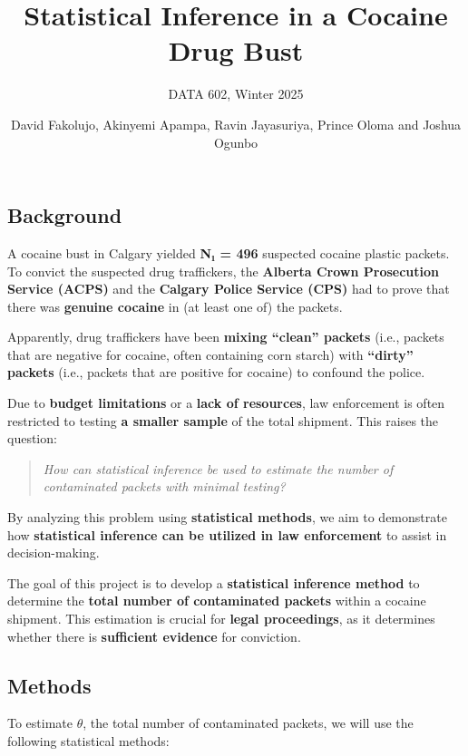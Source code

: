 \documentclass[
  14pt,
]{article}
\title{\textbf{Statistical Inference in a Cocaine Drug Bust}}
\subtitle{DATA 602, Winter 2025}
\author{David Fakolujo, Akinyemi Apampa, Ravin Jayasuriya, Prince Oloma
and Joshua Ogunbo}
\date{}
\begin{document}
\maketitle

\subsection{\texorpdfstring{\textbf{Background}}{Background}}\label{background}

A cocaine bust in Calgary yielded \textbf{N₁ = 496} suspected cocaine
plastic packets. To convict the suspected drug traffickers, the
\textbf{Alberta Crown Prosecution Service (ACPS)} and the
\textbf{Calgary Police Service (CPS)} had to prove that there was
\textbf{genuine cocaine} in (at least one of) the packets.

Apparently, drug traffickers have been \textbf{mixing ``clean'' packets}
(i.e., packets that are negative for cocaine, often containing corn
starch) with \textbf{``dirty'' packets} (i.e., packets that are positive
for cocaine) to confound the police.

Due to \textbf{budget limitations} or a \textbf{lack of resources}, law
enforcement is often restricted to testing \textbf{a smaller sample} of
the total shipment. This raises the question:

\begin{quote}
\emph{How can statistical inference be used to estimate the number of
contaminated packets with minimal testing?}
\end{quote}

By analyzing this problem using \textbf{statistical methods}, we aim to
demonstrate how \textbf{statistical inference can be utilized in law
enforcement} to assist in decision-making.

The goal of this project is to develop a \textbf{statistical inference
method} to determine the \textbf{total number of contaminated packets}
within a cocaine shipment. This estimation is crucial for \textbf{legal
proceedings}, as it determines whether there is \textbf{sufficient
evidence} for conviction.

\subsection{\texorpdfstring{\textbf{Methods}}{Methods}}\label{methods}

To estimate \textbf{\(\theta\)}, the total number of contaminated
packets, we will use the following statistical methods:
\end{document}
